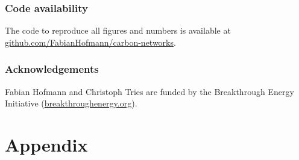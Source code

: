 \documentclass[twocolumn]{article}
\begin{document}
\subsubsection*{Code availability}

The code to reproduce all figures and numbers is available at \href{https://github.com/FabianHofmann/carbon-networks}{github.com/FabianHofmann/carbon-networks}.


\subsubsection*{Acknowledgements}

Fabian Hofmann and Christoph Tries are funded by the Breakthrough Energy Initiative (\href{https://breakthroughenergy.org/}{breakthroughenergy.org}).


\printbibliography

\newpage
\appendix
\setcounter{section}{0}
\renewcommand{\thesection}{\Alph{section}}
\renewcommand{\thefigure}{\Alph{section}.\arabic{figure}}

\onecolumn %

\section{Appendix}
\end{document}
